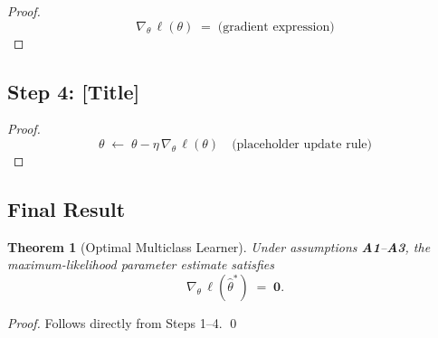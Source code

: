 \documentclass[11pt]{article}
\newtheorem{theorem}{Theorem}[section]
\theoremstyle{definition}
\theoremstyle{remark}
\begin{document}

\begin{proof}
    \[
        \nabla_{\theta}\, \ell(\theta) \;=\; \text{(gradient expression)}
    \]
\end{proof}

\subsection{Step 4: [Title]}


\begin{proof}
    \[
        \theta \;\leftarrow\; \theta - \eta\, \nabla_{\theta}\, \ell(\theta)
        \quad \text{(placeholder update rule)}
    \]
\end{proof}

\subsection{Final Result}

\begin{theorem}[Optimal Multiclass Learner]
    Under assumptions \textbf{A1}--\textbf{A3},
    the maximum-likelihood parameter estimate satisfies
    \[
        \nabla_{\theta}\, \ell\!\left(\hat{\theta}^{*}\right) \;=\; \mathbf{0}.
    \]
\end{theorem}

\begin{proof}
    Follows directly from Steps 1--4. \qed
\end{proof}

\end{document}

